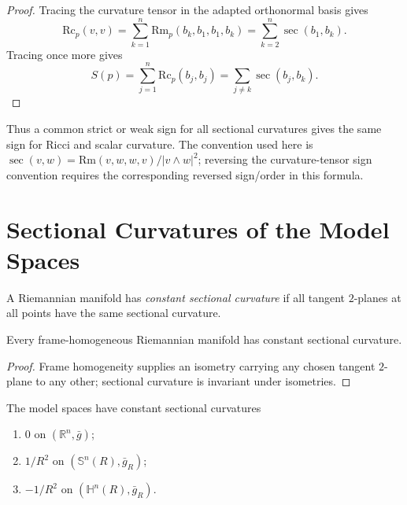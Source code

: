 \begin{proof}
\sketch
Tracing the curvature tensor in the adapted orthonormal basis gives
\[
\mathrm{Rc}_p(v,v)
=\sum_{k=1}^n\mathrm{Rm}_p(b_k,b_1,b_1,b_k)
=\sum_{k=2}^n\sec(b_1,b_k).
\]
Tracing once more gives
\[
S(p)=\sum_{j=1}^n\mathrm{Rc}_p(b_j,b_j)
=\sum_{j\ne k}\sec(b_j,b_k).
\]
\end{proof}

Thus a common strict or weak sign for all sectional curvatures gives the same
sign for Ricci and scalar curvature.  The convention used here is
$\sec(v,w)=\mathrm{Rm}(v,w,w,v)/|v\wedge w|^2$; reversing the curvature-tensor
sign convention requires the corresponding reversed sign/order in this
formula.

\section{Sectional Curvatures of the Model Spaces}

A Riemannian manifold has \emph{constant sectional curvature} if all tangent
$2$-planes at all points have the same sectional curvature.

\begin{lemma}
\label{lem:frame-homogeneous-constant-sectional-curvature}
Every frame-homogeneous Riemannian manifold has constant sectional curvature.
\end{lemma}

\begin{proof}
\sketch
Frame homogeneity supplies an isometry carrying any chosen tangent $2$-plane
to any other; sectional curvature is invariant under isometries.
\end{proof}

\begin{theorem}
\label{thm:sectional-curvatures-model-spaces}

The model spaces have constant sectional curvatures
\begin{enumerate}
\item[(a)] $0$ on $(\mathbb R^n,\bar g)$;
\item[(b)] $1/R^2$ on $(\mathbb S^n(R),\bar g_R)$;
\item[(c)] $-1/R^2$ on $(\mathbb H^n(R),\bar g_R)$.
\end{enumerate}
\end{theorem}


